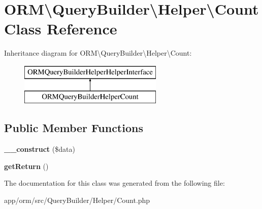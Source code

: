 \hypertarget{classORM_1_1QueryBuilder_1_1Helper_1_1Count}{}\section{O\+RM\textbackslash{}Query\+Builder\textbackslash{}Helper\textbackslash{}Count Class Reference}
\label{classORM_1_1QueryBuilder_1_1Helper_1_1Count}
Inheritance diagram for O\+RM\textbackslash{}Query\+Builder\textbackslash{}Helper\textbackslash{}Count\+:\begin{figure}[H]
\begin{center}
\leavevmode
\includegraphics[height=2.000000cm]{classORM_1_1QueryBuilder_1_1Helper_1_1Count}
\end{center}
\end{figure}
\subsection*{Public Member Functions}
\begin{DoxyCompactItemize}
\item 
{\bfseries \+\_\+\+\_\+construct} (\$data)\hypertarget{classORM_1_1QueryBuilder_1_1Helper_1_1Count_a3c620fb9054429d006fa342434b37af9}{}\label{classORM_1_1QueryBuilder_1_1Helper_1_1Count_a3c620fb9054429d006fa342434b37af9}

\item 
{\bfseries get\+Return} ()\hypertarget{classORM_1_1QueryBuilder_1_1Helper_1_1Count_acd979008fc85b69eb1d1a97ad7bb2b3f}{}\label{classORM_1_1QueryBuilder_1_1Helper_1_1Count_acd979008fc85b69eb1d1a97ad7bb2b3f}

\end{DoxyCompactItemize}


The documentation for this class was generated from the following file\+:\begin{DoxyCompactItemize}
\item 
app/orm/src/\+Query\+Builder/\+Helper/Count.\+php\end{DoxyCompactItemize}
